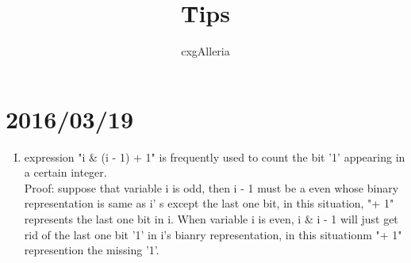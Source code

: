 \documentclass{ctexart}
\begin{document}
\title{%
	\~Tips}
\author{%
	cxgAlleria
}
\maketitle
\tableofcontents
	\section[0319]{2016/03/19}
		\begin{enumerate}[I.]
			\item expression "i \& (i - 1) + 1" is frequently used to count the bit '1' appearing in a certain integer.\\Proof: suppose that variable i is odd, then i - 1 must be a even whose binary representation is same as i' s except the last one bit, in this situation, "+ 1" represents the last one bit in i. When variable i is even, i \& i - 1 will just get rid of the last one bit '1' in i's bianry representation, in this situationm "+ 1" represention the missing '1'.
		\end{enumerate}
\end{document}
